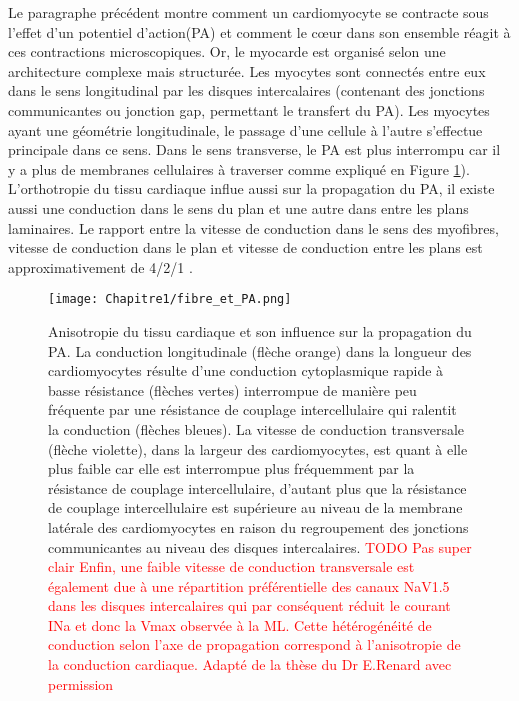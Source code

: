 Le paragraphe précédent montre comment un cardiomyocyte se contracte sous l’effet d’un potentiel d'action(PA) et comment le cœur dans son ensemble réagit à ces contractions microscopiques. Or, le myocarde est organisé selon une architecture complexe mais structurée. Les myocytes sont connectés entre eux dans le sens longitudinal par les disques intercalaires (contenant des jonctions communicantes ou jonction gap, permettant le transfert du PA). Les myocytes ayant une géométrie longitudinale, le passage d’une cellule à l’autre s'effectue principale dans ce sens. Dans le sens transverse, le PA est plus interrompu car il y a plus de membranes cellulaires à traverser comme expliqué en Figure \ref{fig:fig_fibre_et_PA}). L’orthotropie du tissu cardiaque influe aussi sur la propagation du PA, il existe aussi une conduction dans le sens du plan et une autre dans entre les plans laminaires. Le rapport entre la vitesse de conduction dans le sens des myofibres, vitesse de conduction dans le plan et vitesse de conduction entre les plans est approximativement de 4/2/1 \cite{Caldwell2009} \cite{Hooks2007}. 

\begin{figure}[!htbp]
  \begin{center}
    \texttt{[image: Chapitre1/fibre\_et\_PA.png]}
  \end{center}
  \caption{Anisotropie du tissu cardiaque et son influence sur la propagation du PA. La conduction longitudinale (flèche orange) dans la longueur des cardiomyocytes résulte d’une conduction cytoplasmique rapide à basse résistance (flèches vertes) interrompue de manière peu fréquente par une résistance de couplage intercellulaire qui ralentit la conduction (flèches bleues). La vitesse de conduction transversale (flèche violette), dans la largeur des cardiomyocytes, est quant à elle plus faible car elle est interrompue plus fréquemment par la résistance de couplage intercellulaire, d’autant plus que la résistance de couplage intercellulaire est supérieure au niveau de la membrane latérale des cardiomyocytes en raison du regroupement des jonctions communicantes au niveau des disques intercalaires. \textcolor{red}{TODO Pas super clair Enfin, une faible vitesse de conduction transversale est également due à une répartition préférentielle des canaux NaV1.5 dans les disques intercalaires qui par conséquent réduit le courant INa et donc la Vmax observée à la ML. Cette hétérogénéité de conduction selon l’axe de propagation correspond à l’anisotropie de la conduction cardiaque. Adapté de la thèse du Dr E.Renard avec permission} \cite{renard:tel-04344684}}
  \label{fig:fig_fibre_et_PA}
\end{figure}

